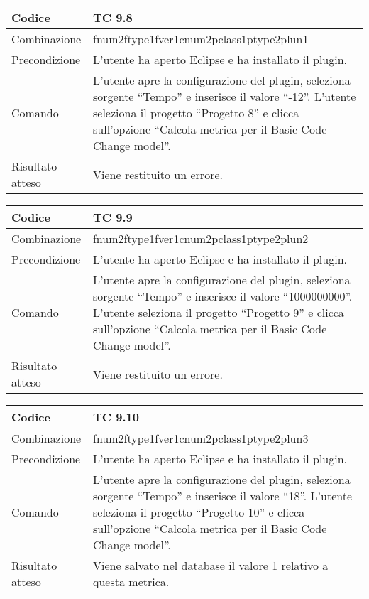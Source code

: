 \begin{table}[ht]
\begin{tabular}{|p{3cm}|p{9cm}|}
\hline
\cellcolor{lightgray}Codice				& TC 9.8								\\
\hline
\cellcolor{lightgray}Combinazione		& fnum2ftype1fver1cnum2pclass1ptype2plun1									\\
\hline
\cellcolor{lightgray}Precondizione		& L'utente ha aperto Eclipse e ha installato il plugin.		\\
\hline
\cellcolor{lightgray}Comando			& L'utente apre la configurazione del plugin, seleziona sorgente ``Tempo'' e inserisce il valore ``-12''. L'utente seleziona il progetto ``Progetto 8''  e clicca sull'opzione ``Calcola metrica per il Basic Code Change model''.	\\
\hline
\cellcolor{lightgray}Risultato atteso	& Viene restituito un errore.\\
\hline
\end{tabular}
\end{table}

\begin{table}[ht]
\begin{tabular}{|p{3cm}|p{9cm}|}
\hline
\cellcolor{lightgray}Codice				& TC 9.9								\\
\hline
\cellcolor{lightgray}Combinazione		& fnum2ftype1fver1cnum2pclass1ptype2plun2									\\
\hline
\cellcolor{lightgray}Precondizione		& L'utente ha aperto Eclipse e ha installato il plugin.		\\
\hline
\cellcolor{lightgray}Comando			& L'utente apre la configurazione del plugin, seleziona sorgente ``Tempo'' e inserisce il valore ``1000000000''. L'utente seleziona il progetto ``Progetto 9''  e clicca sull'opzione ``Calcola metrica per il Basic Code Change model''.	\\
\hline
\cellcolor{lightgray}Risultato atteso	& Viene restituito un errore.\\
\hline
\end{tabular}
\end{table}

\begin{table}[ht]
\begin{tabular}{|p{3cm}|p{9cm}|}
\hline
\cellcolor{lightgray}Codice				& TC 9.10								\\
\hline
\cellcolor{lightgray}Combinazione		& fnum2ftype1fver1cnum2pclass1ptype2plun3									\\
\hline
\cellcolor{lightgray}Precondizione		& L'utente ha aperto Eclipse e ha installato il plugin.		\\
\hline
\cellcolor{lightgray}Comando			& L'utente apre la configurazione del plugin, seleziona sorgente ``Tempo'' e inserisce il valore ``18''. L'utente seleziona il progetto ``Progetto 10''  e clicca sull'opzione ``Calcola metrica per il Basic Code Change model''.	\\
\hline
\cellcolor{lightgray}Risultato atteso	& Viene salvato nel database il valore 1 relativo a questa metrica.\\
\hline
\end{tabular}
\end{table}

